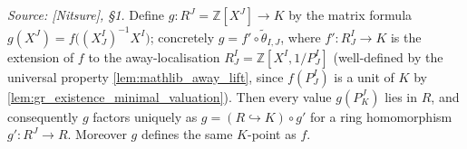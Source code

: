 \begin{lemma}\leanok
  \label{lem:gr_existence_factor_through_valuation_ring}
  \textit{Source: [Nitsure], \S 1.}
  Define \(g : R^J = \mathbb{Z}[X^J] \to K\) by the matrix formula \(g(X^J) =
  f\bigl((X^I_J)^{-1} X^I\bigr)\); concretely \(g = f' \circ \tilde\theta_{I,J}\),
  where \(f' : R^I_J \to K\) is the extension of \(f\) to the away-localisation
  \(R^I_J = \mathbb{Z}[X^I, 1/P^I_J]\) (well-defined by the universal property
  \cref{lem:mathlib_away_lift}, since \(f(P^I_J)\) is a unit of \(K\) by
  \cref{lem:gr_existence_minimal_valuation}). Then every value \(g(P^J_K)\) lies in
  \(R\), and consequently \(g\) factors uniquely as \(g = (R \hookrightarrow K)
  \circ g'\) for a ring homomorphism \(g' : R^J \to R\). Moreover \(g\) defines the
  same \(K\)-point as \(f\).
\end{lemma}
